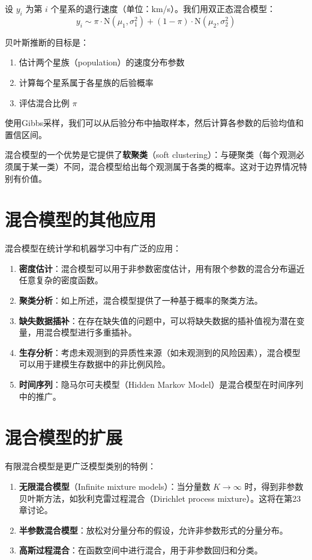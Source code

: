 设 $y_i$ 为第 $i$ 个星系的退行速度（单位：km/s）。我们用双正态混合模型：
\[
y_i \sim \pi \cdot \mathrm{N}(\mu_1, \sigma_1^2) + (1-\pi) \cdot \mathrm{N}(\mu_2, \sigma_2^2)
\]

贝叶斯推断的目标是：
\begin{enumerate}
  \item 估计两个星族（population）的速度分布参数
  \item 计算每个星系属于各星族的后验概率
  \item 评估混合比例 $\pi$
\end{enumerate}

使用Gibbs采样，我们可以从后验分布中抽取样本，然后计算各参数的后验均值和置信区间。

\begin{Remark}
  混合模型的一个优势是它提供了\textbf{软聚类}（soft clustering）：与硬聚类（每个观测必须属于某一类）不同，混合模型给出每个观测属于各类的概率。这对于边界情况特别有价值。
\end{Remark}

\section{混合模型的其他应用}

混合模型在统计学和机器学习中有广泛的应用：

\begin{enumerate}
  \item \textbf{密度估计}：混合模型可以用于非参数密度估计，用有限个参数的混合分布逼近任意复杂的密度函数。
  \item \textbf{聚类分析}：如上所述，混合模型提供了一种基于概率的聚类方法。
  \item \textbf{缺失数据插补}：在存在缺失值的问题中，可以将缺失数据的插补值视为潜在变量，用混合模型进行多重插补。
  \item \textbf{生存分析}：考虑未观测到的异质性来源（如未观测到的风险因素），混合模型可以用于建模生存数据中的非比例风险。
  \item \textbf{时间序列}：隐马尔可夫模型（Hidden Markov Model）是混合模型在时间序列中的推广。
\end{enumerate}

\section{混合模型的扩展}

有限混合模型是更广泛模型类别的特例：

\begin{enumerate}
  \item \textbf{无限混合模型}（Infinite mixture models）：当分量数 $K \to \infty$ 时，得到非参数贝叶斯方法，如狄利克雷过程混合（Dirichlet process mixture）。这将在第23章讨论。
  \item \textbf{半参数混合模型}：放松对分量分布的假设，允许非参数形式的分量分布。
  \item \textbf{高斯过程混合}：在函数空间中进行混合，用于非参数回归和分类。
\end{enumerate}


